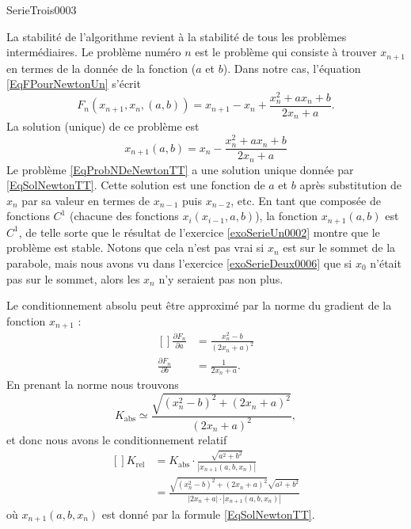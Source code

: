 
\begin{corrige}{SerieTrois0003}

	La stabilité de l'algorithme revient à la stabilité de tous les problèmes intermédiaires. Le problème numéro $n$ est le problème qui consiste à trouver $x_{n+1}$ en termes de la donnée de la fonction ($a$ et $b$). Dans notre cas, l'équation \eqref{EqFPourNewtonUn} s'écrit
	\begin{equation}		\label{EqProbNDeNewtonTT}
		F_n(x_{n+1},x_n,(a,b))=x_{n+1}-x_n+\frac{ x_n^2+ax_n+b }{ 2x_n+a }.
	\end{equation}
	La solution (unique) de ce problème est
	\begin{equation}		\label{EqSolNewtonTT}
		x_{n+1}(a,b)=x_n-\frac{ x_n^2+ax_n+b }{ 2x_n+a }
	\end{equation}
	Le problème \eqref{EqProbNDeNewtonTT} a une solution unique donnée par \eqref{EqSolNewtonTT}. Cette solution est une fonction de $a$ et $b$ après substitution de $x_n$ par sa valeur en termes de $x_{n-1}$ puis $x_{n-2}$, etc. En tant que composée de fonctions $C^1$ (chacune des fonctions $x_i(x_{i-1},a,b)$), la fonction $x_{n+1}(a,b)$ est $C^1$, de telle sorte que le résultat de l'exercice \ref{exoSerieUn0002} montre que le problème est stable. Notons que cela n'est pas vrai si $x_n$ est sur le sommet de la parabole, mais nous avons vu dans l'exercice \ref{exoSerieDeux0006} que si $x_0$ n'était pas sur le sommet, alors les $x_n$ n'y seraient pas non plus.

	Le conditionnement absolu peut être approximé par la norme du gradient de la fonction $x_{n+1}$ :
	\begin{equation}
		\begin{aligned}[]
			\frac{ \partial F_n }{ \partial a }&=\frac{ x_n^2-b }{ (2x_n+a)^2 }\\
			\frac{ \partial F_n }{ \partial b }&=\frac{1}{ 2x_n+a }.
		\end{aligned}
	\end{equation}
	En prenant la norme nous trouvons
	\begin{equation}
		K_{\text{abs}}\simeq \frac{ \sqrt{(x_n^2-b)^2+(2x_n+a)^2} }{ (2x_n+a)^2 },
	\end{equation}
	et donc nous avons le conditionnement relatif
	\begin{equation}\label{EqKReltroitroti}
		\begin{aligned}[]
			K_{\text{rel}}&=K_{\text{abs}}\cdot\frac{ \sqrt{a^2+b^2} }{ | x_{n+1}(a,b,x_n) | }\\
			&=\frac{ \sqrt{(x_n^2-b)^2+(2x_n+a)^2}\sqrt{a^2+b^2} }{ | 2x_n+a |\cdot| x_{n+1}(a,b,x_n) | }
		\end{aligned}
	\end{equation}
	où $x_{n+1}(a,b,x_n)$ est donné par la formule \eqref{EqSolNewtonTT}.


\end{corrige}
